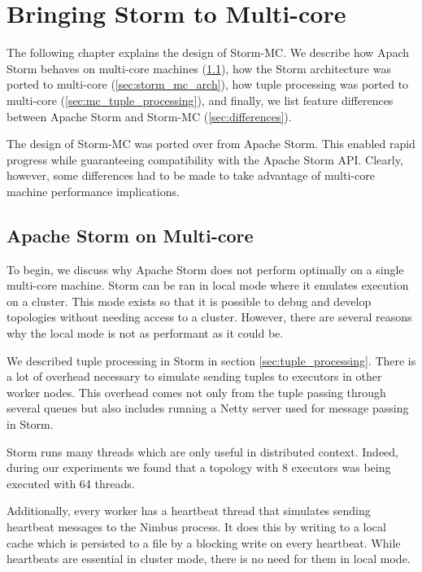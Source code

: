 \chapter{Bringing Storm to Multi-core}

The following chapter explains the design of Storm-MC. We describe how Apach Storm behaves on multi-core machines (\ref{sec:storm_on_mc}), how the Storm architecture was ported to multi-core (\ref{sec:storm_mc_arch}), how tuple processing was ported to multi-core (\ref{sec:mc_tuple_processing}), and finally, we list feature differences between Apache Storm and Storm-MC (\ref{sec:differences}).

The design of Storm-MC was ported over from Apache Storm. This enabled rapid progress while guaranteeing compatibility with the Apache Storm API. Clearly, however, some differences had to be made to take advantage of multi-core machine performance implications. 

\section{Apache Storm on Multi-core}
\label{sec:storm_on_mc}

To begin, we discuss why Apache Storm does not perform optimally on a single multi-core machine. Storm can be ran in local mode where it emulates execution on a cluster. This mode exists so that it is possible to debug and develop topologies without needing access to a cluster. However, there are several reasons why the local mode is not as performant as it could be.

We described tuple processing in Storm in section \ref{sec:tuple_processing}. There is a lot of overhead necessary to simulate sending tuples to executors in other worker nodes. This overhead comes not only from the tuple passing through several queues but also includes running a Netty \cite{Netty} server used for message passing in Storm.

Storm runs many threads which are only useful in distributed context. Indeed, during our experiments we found that a topology with 8 executors was being executed with 64 threads.


Additionally, every worker has a heartbeat thread that simulates sending heartbeat messages to the Nimbus process. It does this by writing to a local cache which is persisted to a file by a blocking write on every heartbeat. While heartbeats are essential in cluster mode, there is no need for them in local mode.

